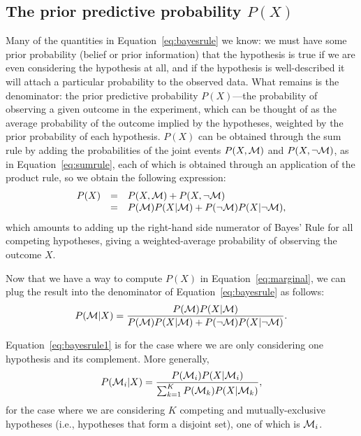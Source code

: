 \subsection*{The prior predictive probability $P(X)$}
Many of the quantities in Equation~\ref{eq:bayesrule} we know: we must have some prior probability (belief or prior information) that the hypothesis is true if we are even considering the hypothesis at all, and if the hypothesis is well-described it will attach a particular probability to the observed data. What remains is the denominator: the prior predictive probability $P(X)$---the probability of observing a given outcome in the experiment, which can be thought of as the average probability of the outcome implied by the hypotheses, weighted by the prior probability of each hypothesis. $P(X)$ can be obtained through the sum rule by adding the probabilities of the joint events $P(X,{\cal M})$ and $P(X,\neg{{\cal M}})$, as in Equation~\ref{eq:sumrule}, each of which is obtained through an application of the product rule, so we obtain the following expression:
\begin{equation}\label{eq:marginal}\begin{array}{rcl}
P(X) &=& P(X,{\cal M}) + P(X,\neg{{\cal M}})\\ 
&=& P({\cal M})P(X|{\cal M}) + P(\neg{{\cal M}})P(X|\neg{{\cal M}}),
\end{array}\end{equation}
which amounts to adding up the right-hand side numerator of Bayes' Rule for all competing hypotheses, giving a weighted-average probability of observing the outcome $X$. 

Now that we have a way to compute $P(X)$ in Equation~\ref{eq:marginal}, we can plug the result into the denominator of Equation~\ref{eq:bayesrule} as follows: \begin{equation}\label{eq:bayesrule1}P({\cal M}|X) = \frac{P({\cal M})P(X|{\cal M})}{P({\cal M})P(X|{\cal M}) + P(\neg{{\cal M}})P(X|\neg{{\cal M}})}.\end{equation}

Equation~\ref{eq:bayesrule1} is for the case where we are only considering one hypothesis and its complement. More generally,
\begin{equation}
P({\cal M}_i|X) = \frac{P({\cal M}_i)P(X|{\cal M}_i)}{\sum_{k=1}^K P({\cal M}_k)P(X|{\cal M}_k)},
\label{eq:bayesrule2}
\end{equation}
for the case where we are considering $K$ competing and mutually-exclusive hypotheses (i.e., hypotheses that form a disjoint set), one of which is ${\cal M}_i$. 

